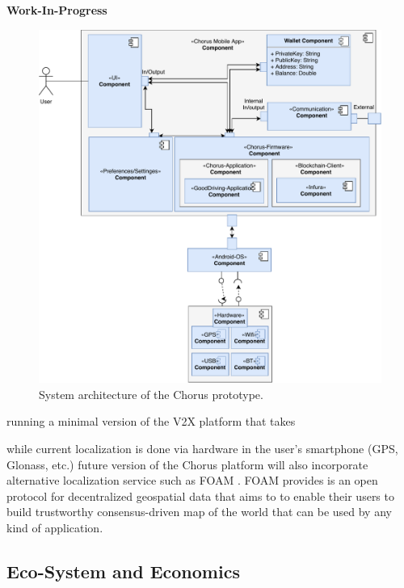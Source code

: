 \documentclass{llncs}
\begin{document}
{			\textbf{Work-In-Progress}

			\begin{figure}[H]
				\centering
				\includegraphics[scale=0.65]{Figures/prototype-architecture/20180509_prototype-architecture-merge.pdf}
				\caption{System architecture of the Chorus prototype.}	
				\label{fig:prototype-system-architecture}
			\end{figure}
	

			running a minimal version of the V2X platform that takes 


			while current localization is done via hardware in the user's smartphone (GPS, Glonass, etc.) future version of the Chorus platform will also incorporate alternative localization service such as FOAM \cite{foamWhitepaper}. FOAM provides is an open protocol for decentralized geospatial data that aims to to enable their users to build trustworthy consensus-driven map of the world that can be used by any kind of application.


		\subsection{Eco-System and Economics}
			\label{ss:prototype-incentives}
		
}
\end{document}

